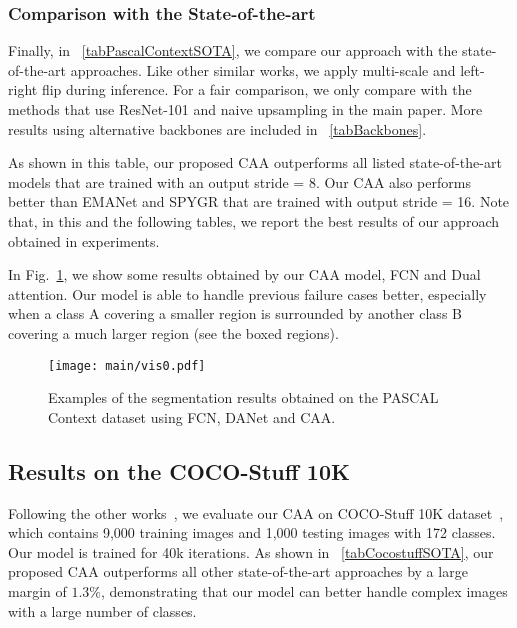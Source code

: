 \documentclass[letterpaper]{article} \usepackage{aaai22}  \usepackage{times}  \usepackage{helvet}  \usepackage{courier}  \usepackage[hyphens]{url}  \usepackage{graphicx} \urlstyle{rm} \def\UrlFont{\rm}  \usepackage{natbib}  \usepackage{caption} \DeclareCaptionStyle{ruled}{labelfont=normalfont,labelsep=colon,strut=off} \frenchspacing  \setlength{\pdfpagewidth}{8.5in}  \setlength{\pdfpageheight}{11in}  \usepackage{algorithm}
\begin{document}
\subsubsection{Comparison with the State-of-the-art}
\label{lab:PascalCtxSOTA}

Finally,  in \tablename{~\ref{tabPascalContextSOTA}}, we compare our approach with the state-of-the-art approaches. 
Like other similar works, we apply multi-scale and left-right flip during inference. 
For a fair comparison, we only compare with the methods that use ResNet-101 and naive upsampling in the main paper. More results using alternative backbones are included in \tablename{~\ref{tabBackbones}}.

As shown in this table, our proposed CAA outperforms all listed state-of-the-art models that are trained with an output stride = 8. 
Our CAA also performs better than EMANet and SPYGR that are trained with output stride = 16.  
Note that, in this and the following tables, we report the best results of our approach obtained in experiments.

In Fig.~\ref{fvis0}, we show some results obtained by our CAA model, FCN and Dual attention.
Our model is able to handle previous failure cases better, especially when a class A covering a smaller region is surrounded by another class B covering a much larger region (see the boxed regions).

\begin{figure}[t]
	\centering
\texttt{[image: main/vis0.pdf]}
	\caption{Examples of the segmentation results obtained on the PASCAL Context dataset using FCN, DANet and CAA. }
	\label{fvis0}
\end{figure}


\subsection{Results on the COCO-Stuff 10K}

Following the other works~\cite{cDualAttention}, we evaluate our CAA on COCO-Stuff 10K dataset~\cite{cCocoStuff}, which contains 9,000 training images and 1,000 testing images with 172 classes. Our model is trained for 40k iterations.
As shown in \tablename{~\ref{tabCocostuffSOTA}}, our proposed CAA outperforms all other state-of-the-art approaches by a large margin of $1.3\%$, demonstrating that our model can better handle complex images with a large number of classes.
\end{document}
